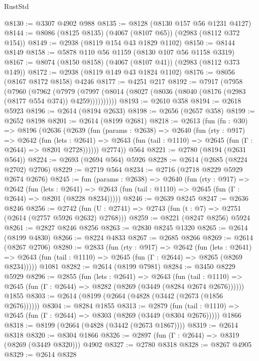 \begin{lexlean}{RustStd}
\begin{coremodule}
@8130 := @3307 @4902 @988
@8135 := @8128 (@8130 @157 @56 @1231 @4127)
@8144 := @8086 (@8125 @8135) (@4067 (@8107 @65)) (@2983 (@8112 @372 @154))
@8149 := @2938 (@8119 @154 @43 @1829 @1102)
@8150 := @8144 @8149
@8158 := @5878 @110 @56 @1159 (@8130 @107 @56 @1158 @3319)
@8167 := @8074 (@8150 @8158) (@4067 (@8107 @41)) (@2983 (@8112 @373 @149))
@8172 := @2938 (@8119 @149 @43 @1824 @1102)
@8176 := @8056 (@8167 @8172 @8158) @4246
@8177 := @4251 @217
@8192 := @7917
    (@7958
      (@7960
        (@7962
          (@7979 (@7997 (@8014 (@8027 (@8036 (@8040 (@8176 (@2983 (@8177 @554 @374)) @4259))))))))))
@8193 := @2610 @358
@8194 := @2618 @5923
@8196 := @2614 (@8194 @2633)
@8198 := @2656 (@2657 @358)
@8199 := @2652 @8198
@8201 := @2614 (@8199 @2681)
@8218 := @2613
    (fun (fn : @30) =>
    @8196
      (@2636
        (@2639
          (fun (params : @2638) =>
          @2640
            (fun (rty : @917) =>
            @2642
              (fun (lets : @2641) =>
              @2643 (fun (tail : @1110) => @2645 (fun (Γ : @2644) => @8201 @2728))))))
        @2774))
    @564
@8221 := @2780 (@8194 (@2631 @564))
@8224 := @2693 (@2694 @564) @5926
@8228 := @2614 (@2685 (@8224 @2702) @2706)
@8229 := @2719 @564
@8234 := @2716 (@2718 @8229 @5929 @2674 @2676)
@8245 := fun (params : @2638) =>
  @2640
    (fun (rty : @917) =>
    @2642
      (fun (lets : @2641) =>
      @2643 (fun (tail : @1110) => @2645 (fun (Γ : @2644) => @8201 (@8228 @8234)))))
@8246 := @2639 @8245
@8247 := @2636 @8246
@8256 := @2742 (fun (U : @2741) => @2743 (fun (t : @7) => @2751 (@2614 (@2757 @5926 @2632) @2768)))
@8259 := @8221 (@8247 @8256) @5924
@8261 := @2827 @8246 @8256
@8263 := @2830 @8245 @1320
@8265 := @2614 (@8199 @4830)
@8266 := @8224 @4833
@8267 := @2685 @8266
@8269 := @2614 (@8267 @2706)
@8280 := @2833
    (fun (rty : @917) =>
    @2642
      (fun (lets : @2641) =>
      @2643 (fun (tail : @1110) => @2645 (fun (Γ : @2644) => @8265 (@8269 @8234)))))
    @1081
@8282 := @2614 (@8199 @7981)
@8284 := @3450 @8229 @5929
@8296 := @2855
    (fun (lets : @2641) =>
    @2643
      (fun (tail : @1110) => @2645 (fun (Γ : @2644) => @8282 (@8269 (@3449 (@8284 @2674 @2676))))))
    @1855
@8303 := @2614 (@8199 (@2664 (@4828 (@3442 (@2673 (@1856 @2676))))))
@8304 := @8284 @1855
@8313 := @2879
    (fun (tail : @1110) => @2645 (fun (Γ : @2644) => @8303 (@8269 (@3449 (@8304 @2676)))))
    @1866
@8318 := @8199 (@2664 (@4828 (@3442 (@2673 @1867))))
@8319 := @2614 @8318
@8320 := @8304 @1866
@8326 := @2897 (fun (Γ : @2644) => @8319 (@8269 (@3449 @8320))) @4902
@8327 := @2780 @8318
@8328 := @8267 @4905
@8329 := @2614 @8328

\end{coremodule}
\end{lexlean}
